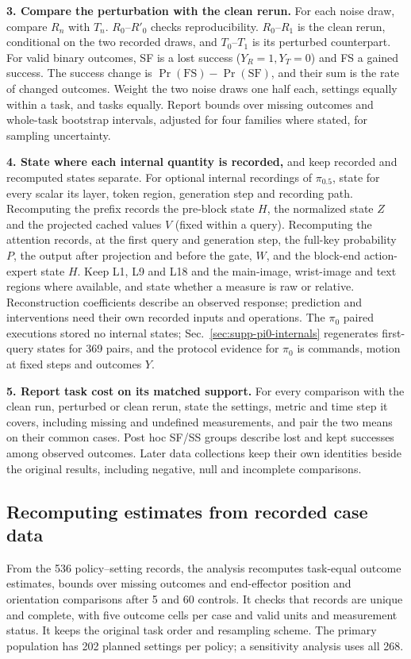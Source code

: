 \noindent\textbf{3. Compare the perturbation with the clean rerun.} For each noise draw, compare $R_n$ with $T_n$. $R_0$--$R'_0$ checks reproducibility. $R_0$--$R_1$ is the clean rerun, conditional on the two recorded draws, and $T_0$--$T_1$ is its perturbed counterpart. For valid binary outcomes, SF is a lost success ($Y_R=1,Y_T=0$) and FS a gained success. The success change is $\Pr(\mathrm{FS})-\Pr(\mathrm{SF})$, and their sum is the rate of changed outcomes. Weight the two noise draws one half each, settings equally within a task, and tasks equally. Report bounds over missing outcomes and whole-task bootstrap intervals, adjusted for four families where stated, for sampling uncertainty.

\noindent\textbf{4. State where each internal quantity is recorded,} and keep recorded and recomputed states separate. For optional internal recordings of $\pi_{0.5}$, state for every scalar its layer, token region, generation step and recording path. Recomputing the prefix records the pre-block state $H$, the normalized state $Z$ and the projected cached values $V$ (fixed within a query). Recomputing the attention records, at the first query and generation step, the full-key probability $P$, the output after projection and before the gate, $W$, and the block-end action-expert state $H$. Keep L1, L9 and L18 and the main-image, wrist-image and text regions where available, and state whether a measure is raw or relative. Reconstruction coefficients describe an observed response; prediction and interventions need their own recorded inputs and operations. The $\pi_0$ paired executions stored no internal states; Sec.~\ref{sec:supp-pi0-internals} regenerates first-query states for 369 pairs, and the protocol evidence for $\pi_0$ is commands, motion at fixed steps and outcomes $Y$.

\noindent\textbf{5. Report task cost on its matched support.} For every comparison with the clean run, perturbed or clean rerun, state the settings, metric and time step it covers, including missing and undefined measurements, and pair the two means on their common cases. Post hoc SF/SS groups describe lost and kept successes among observed outcomes. Later data collections keep their own identities beside the original results, including negative, null and incomplete comparisons.

\subsection{Recomputing estimates from recorded case data}
\label{sec:supp-protocol-validation}
From the 536 policy--setting records, the analysis recomputes task-equal outcome estimates, bounds over missing outcomes and end-effector position and orientation comparisons after 5 and 60 controls. It checks that records are unique and complete, with five outcome cells per case and valid units and measurement status. It keeps the original task order and resampling scheme. The primary population has 202 planned settings per policy; a sensitivity analysis uses all 268.

